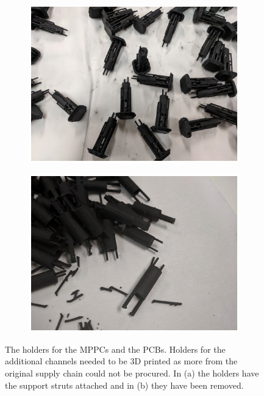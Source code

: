 \begin{figure}[!h]
\centering
\begin{subfigure}{.5\textwidth}
  \centering
  \includegraphics[width=\linewidth]{Chapter3/Figs/Raster/detCon015b_3dPrintedHolders.png}
  \captionsetup{width=.9\linewidth}
  \caption{}
  \label{subFig:detCon015b_3dPrintedHolders}
\end{subfigure}%
\begin{subfigure}{.5\textwidth}
  \centering
  \includegraphics[width=\linewidth]{Chapter3/Figs/Raster/detCon016b_3dPrintedFreed.png}
  \captionsetup{width=.9\linewidth}
  \caption{}
  \label{subFig:detCon016b_3dPrintedFreed}
\end{subfigure}
\caption[The holders for the MPPCs and the PCBs]{The holders for the MPPCs and the PCBs. Holders for the additional channels needed to be 3D printed as more from the original supply chain could not be procured. In (a) the holders have the support struts attached and in (b) they have been removed.}
\label{fig:detCon_3dPrintedHolders_3dPrintedFreed}
\end{figure}

